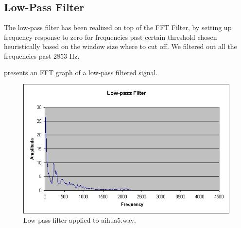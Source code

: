 \subsection{Low-Pass Filter}\label{sect:low-pass}

The low-pass filter has been realized on top of the FFT Filter,
by setting up frequency response to zero for frequencies
past certain threshold chosen heuristically
based on the window size where to cut off. We filtered out
all the frequencies past 2853 Hz.

 presents an FFT graph of a
low-pass filtered signal.

\begin{figure}
	\centering
	\includegraphics[width=400pt]{../graphics/graphs/low-pass-filter.png}
	\caption{Low-pass filter applied to aihua5.wav.}
	\label{fig:low-pass}
\end{figure}
